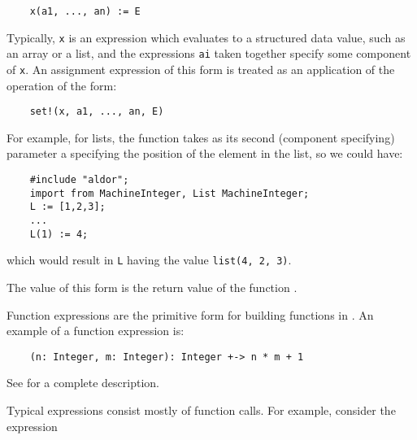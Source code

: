 \begin{small}
\begin{verbatim}
    x(a1, ..., an) := E
\end{verbatim}
\end{small}

Typically, \verb"x" is an expression which evaluates to a structured data
value, such as an array or a list, and the expressions \verb"ai" taken
together specify some component of \verb"x".  An assignment expression of
this form is treated as an application of the operation  of the
form: 

\verb^    ^{\tt set!(x, a1, ..., an, E)} 

For example, for lists, the  function
takes as its second (component specifying)
parameter a  specifying the position
of the element in the list, so we could have:
\begin{small}
\begin{verbatim}
    #include "aldor";
    import from MachineInteger, List MachineInteger;
    L := [1,2,3];
    ...
    L(1) := 4;
\end{verbatim}
\end{small}
which would result in \verb"L" having the value \verb"list(4, 2, 3)".

The value of this form is the return value of the function
.


Function expressions are the primitive form for building functions
in \asharp{}.  
An example of a function expression is:

\begin{small}
\begin{verbatim}
    (n: Integer, m: Integer): Integer +-> n * m + 1
\end{verbatim}
\end{small}

See  for a complete description.


Typical expressions consist mostly of function calls.
For example, consider the expression

